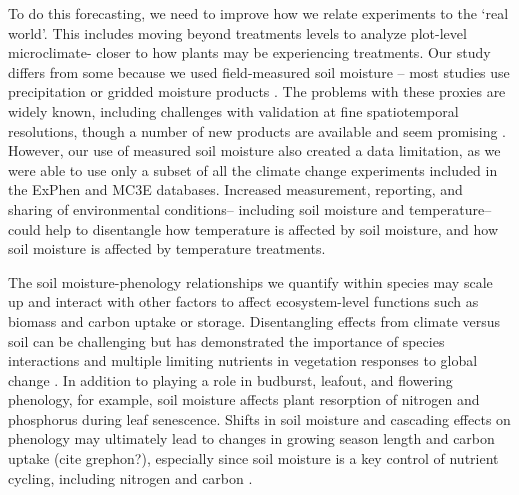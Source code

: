 \documentclass{article}
\begin{document}
\par To do this forecasting, we need to improve how we relate experiments to the `real world'. This includes moving beyond treatments levels to analyze plot-level microclimate- closer to how plants may be experiencing treatments. Our study differs from some because we used field-measured soil moisture -- most studies use precipitation \citep[e.g.,][]{tao2020} or gridded moisture products \citep[e.g.,][]{tao2019}. The problems with these proxies are widely known, including challenges with validation at fine spatiotemporal resolutions, though a number of new products are available and seem promising \citep{peng2021roadmap,brocca2024exploring}. However, our use of measured soil moisture also created a data limitation, as we were able to use only a subset of all the climate change experiments included in the ExPhen and MC3E databases. Increased measurement, reporting, and sharing of environmental conditions-- including soil moisture and temperature-- could help to disentangle how temperature is affected by soil moisture, and how soil moisture is affected by temperature treatments.
\par The soil moisture-phenology relationships we quantify within species may scale up and interact with other factors to affect ecosystem-level functions such as biomass and carbon uptake or storage. Disentangling effects from climate versus soil can be challenging but has demonstrated the importance of species interactions and multiple limiting nutrients in vegetation responses to global change \citep{wilfahrt2021}. In addition to playing a role in  budburst, leafout, and flowering phenology, for example, soil moisture affects plant resorption of nitrogen and phosphorus during leaf senescence\citep{estiarte2022}. Shifts in soil moisture and cascading effects on phenology may ultimately lead to changes in growing season length and carbon uptake (cite grephon?), especially since soil moisture is a key control of nutrient cycling, including nitrogen and carbon \citep{liu2019soil}.
\end{document}
